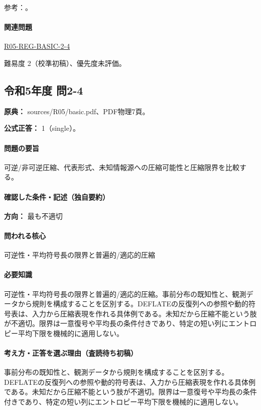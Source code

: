 \par 参考：\cite{info_deflate,info_lossless,info_universal,info_jpeg,info_mpeg}。

\paragraph{関連問題} \hyperref[q:r05-reg-basic-2-4]{R05-REG-BASIC-2-4}

\par 難易度 2（校準初稿）、優先度未評価。

\subsection{令和5年度 問2-4}
\label{q:r05-reg-basic-2-4}

\noindent\textbf{原典：} sources/R05/basic.pdf、PDF物理7頁。

\textbf{公式正答：} 1（single）。

\paragraph{問題の要旨} 可逆/非可逆圧縮、代表形式、未知情報源への圧縮可能性と圧縮限界を比較する。

\paragraph{確認した条件・記述（独自要約）}\mbox{}\par

\noindent\textbf{方向：} 最も不適切\par

\paragraph{問われる核心} 可逆性・平均符号長の限界と普遍的/適応的圧縮

\paragraph{必要知識} 可逆性・平均符号長の限界と普遍的/適応的圧縮。事前分布の既知性と、観測データから規則を構成することを区別する。DEFLATEの反復列への参照や動的符号表は、入力から圧縮表現を作れる具体例である。未知だから圧縮不能という肢が不適切。限界は一意復号や平均長の条件付きであり、特定の短い列にエントロピー平均下限を機械的に適用しない。

\paragraph{考え方・正答を選ぶ理由（査読待ち初稿）} 事前分布の既知性と、観測データから規則を構成することを区別する。DEFLATEの反復列への参照や動的符号表は、入力から圧縮表現を作れる具体例である。未知だから圧縮不能という肢が不適切。限界は一意復号や平均長の条件付きであり、特定の短い列にエントロピー平均下限を機械的に適用しない。

